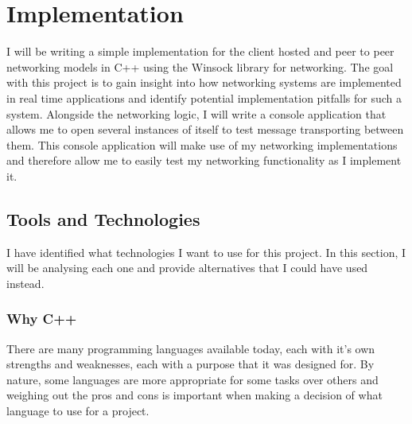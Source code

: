 




\chapter{Implementation}
I will be writing a simple implementation for the client hosted and peer to peer networking models in C++ using the Winsock library for networking. The goal with this project is to gain insight into how networking systems are implemented in real time applications and identify potential implementation pitfalls for such a system. Alongside the networking logic, I will write a console application that allows me to open several instances of itself to test message transporting between them. This console application will make use of my networking implementations and therefore allow me to easily test my networking functionality as I implement it.

\section{Tools and Technologies}
I have identified what technologies I want to use for this project. In this section, I will be analysing each one and provide alternatives that I could have used instead.

\subsection{Why C++}
There are many programming languages available today, each with it's own strengths and weaknesses, each with a purpose that it was designed for. By nature, some languages are more appropriate for some tasks over others and weighing out the pros and cons is important when making a decision of what language to use for a project.

